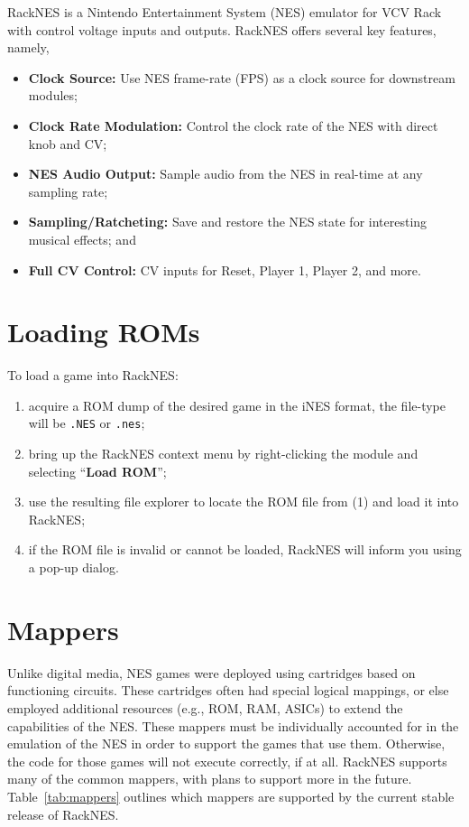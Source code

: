 \documentclass[12pt,a4paper]{article}
\begin{document}
RackNES is a Nintendo Entertainment System (NES) emulator for VCV Rack with control voltage inputs and outputs. RackNES offers several key features, namely,

\begin{itemize}
  \item \textbf{Clock Source:} Use NES frame-rate (FPS) as a clock source for downstream modules;
  \item \textbf{Clock Rate Modulation:} Control the clock rate of the NES with direct knob and CV;
  \item \textbf{NES Audio Output:} Sample audio from the NES in real-time at any sampling rate;
  \item \textbf{Sampling/Ratcheting:} Save and restore the NES state for interesting musical effects; and
  \item \textbf{Full CV Control:} CV inputs for Reset, Player 1, Player 2, and more.
\end{itemize}


\section{Loading ROMs}

To load a game into RackNES:
\begin{enumerate}
  \item acquire a ROM dump of the desired game in the iNES format, the file-type will be \texttt{.NES} or \texttt{.nes};
  \item bring up the RackNES context menu by right-clicking the module and selecting ``\textbf{Load ROM}'';
  \item use the resulting file explorer to locate the ROM file from (1) and load it into RackNES;
  \item if the ROM file is invalid or cannot be loaded, RackNES will inform you using a pop-up dialog.
\end{enumerate}


\section{Mappers}

Unlike digital media, NES games were deployed using cartridges based on functioning circuits. These cartridges often had special logical mappings, or else employed additional resources (e.g., ROM, RAM, ASICs) to extend the capabilities of the NES. These mappers must be individually accounted for in the emulation of the NES in order to support the games that use them. Otherwise, the code for those games will not execute correctly, if at all. RackNES supports many of the common mappers, with plans to support more in the future. Table~\ref{tab:mappers} outlines which mappers are supported by the current stable release of RackNES.
\end{document}
